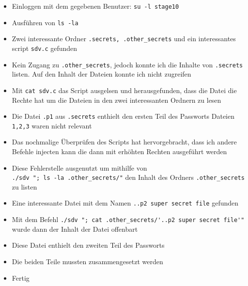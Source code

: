 \documentclass[12pt, a4paper, titlepage, oneside]{scrartcl}
\begin{document}
	\begin{itemize}
		\item Einloggen mit dem gegebenen Benutzer: \lstinline{su -l stage10}

		\item Ausführen von \lstinline{ls -la}

		\item Zwei interessante Ordner \lstinline{.secrets, .other_secrets} und ein
			interessantes script \lstinline{sdv.c} gefunden

		\item Kein Zugang zu \lstinline{.other_secrets}, jedoch konnte ich die Inhalte
			von \lstinline{.secrets} listen. Auf den Inhalt der Dateien konnte ich nicht
			zugreifen

		\item Mit \lstinline{cat sdv.c} das Script ausgelsen und herausgefunden, dass
			die Datei die Rechte hat um die Dateien in den zwei interessanten Ordnern zu
			lesen

		\item Die Datei \lstinline{.p1} aus \lstinline{.secrets} enthielt den ersten
			Teil des Passworts Dateien \lstinline{1,2,3} waren nicht relevant

		\item Das nochmalige Überprüfen des Scripts hat hervorgebracht, dass ich
			andere Befehle injecten kann die dann mit erhöhten Rechten ausgeführt
			werden

		\item Diese Fehlerstelle ausgenutzt um mithilfe von \\ \lstinline{./sdv "; ls -la .other_secrets/"}
			den Inhalt des Ordners \lstinline{.other_secrets} zu listen

		\item Eine interessante Datei mit dem Namen \lstinline{..p2 super secret file}
			gefunden

		\item Mit dem Befehl \lstinline{./sdv "; cat .other_secrets/'..p2 super secret file'"}
			wurde dann der Inhalt der Datei offenbart

		\item Diese Datei enthielt den zweiten Teil des Passworts

		\item Die beiden Teile mussten zusammengesetzt werden

		\item Fertig
	\end{itemize}
\end{document}
